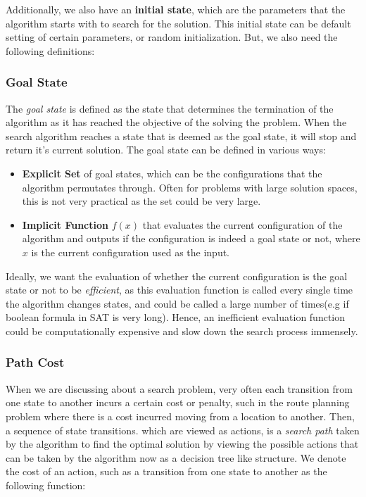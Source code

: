 \documentclass[12pt]{article}
\begin{document}
Additionally, we also have an \textbf{initial state}, which are the parameters that the algorithm starts with to search for the solution. This initial state can be default setting of certain parameters, or random initialization. But, we also need the following definitions:

\subsubsection{Goal State}

The \textit{goal state} is defined as the state that determines the termination of the algorithm as it has reached the objective of the solving the problem. When the search algorithm reaches a state that is deemed as the goal state, it will stop and return it's current solution. The goal state can be defined in various ways:

\begin{itemize}
\item \textbf{Explicit Set} of goal states, which can be the configurations that the algorithm permutates through. Often for problems with large solution spaces, this is not very practical as the set could be very large. 
\item \textbf{Implicit Function} $f(x)$ that evaluates the current configuration of the algorithm and outputs if the configuration is indeed a goal state or not, where $x$ is the current configuration used as the input.
\end{itemize}

Ideally, we want the evaluation of whether the current configuration is the goal state or not to be \textit{efficient}, as this evaluation function is called every single time the algorithm changes states, and could be called a large number of times(e.g if boolean formula in SAT is very long). Hence, an inefficient evaluation function could be computationally expensive and slow down the search process immensely.

\subsubsection{Path Cost}

When we are discussing about a search problem, very often each transition from one state to another incurs a certain cost or penalty, such in the route planning problem where there is a cost incurred moving from a location to another. Then, a sequence of state transitions. which are viewed as actions, is a \textit{search path} taken by the algorithm to find the optimal solution by viewing the possible actions that can be taken by the algorithm now as a decision tree like structure. We denote the cost of an action, such as a transition from one state to another as the following function:
\end{document}
